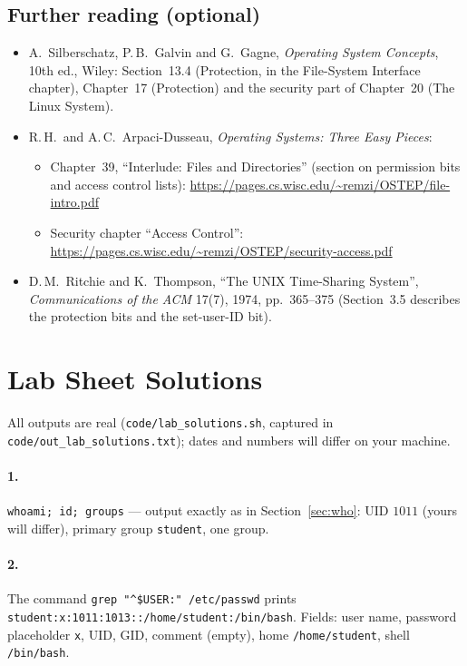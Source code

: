 \documentclass[11pt,a4paper]{article}
\newcommand{\cmd}[1]{\texttt{#1}}
\begin{document}
\subsection*{Further reading (optional)}
\begin{itemize}
  \item A.\ Silberschatz, P.\,B.\ Galvin and G.\ Gagne, \emph{Operating System Concepts}, 10th ed., Wiley: Section~13.4 (Protection, in the File-System Interface chapter), Chapter~17 (Protection) and the security part of Chapter~20 (The Linux System).
  \item R.\,H.\ and A.\,C.\ Arpaci-Dusseau, \emph{Operating Systems: Three Easy Pieces}:
  \begin{itemize}
    \item Chapter~39, ``Interlude: Files and Directories'' (section on permission bits and access control lists): \url{https://pages.cs.wisc.edu/~remzi/OSTEP/file-intro.pdf}
    \item Security chapter ``Access Control'': \url{https://pages.cs.wisc.edu/~remzi/OSTEP/security-access.pdf}
  \end{itemize}
  \item D.\,M.\ Ritchie and K.\ Thompson, ``The UNIX Time-Sharing System'', \emph{Communications of the ACM} 17(7), 1974, pp.~365--375 (Section~3.5 describes the protection bits and the set-user-ID bit).
\end{itemize}

\section{Lab Sheet Solutions}
\label{sec:sol}

All outputs are real (\cmd{code/lab\_solutions.sh}, captured in \cmd{code/out\_lab\_solutions.txt}); dates and numbers will differ on your machine.

\paragraph{1.} \cmd{whoami; id; groups} --- output exactly as in Section~\ref{sec:who}: UID $1011$ (yours will differ), primary group \texttt{student}, one group.

\paragraph{2.} The command \cmd{grep "\^{}\$USER:" /etc/passwd} prints\\ \texttt{student:x:1011:1013::/home/student:/bin/bash}. Fields: user name, password placeholder \texttt{x}, UID, GID, comment (empty), home \texttt{/home/student}, shell \texttt{/bin/bash}.
\end{document}
